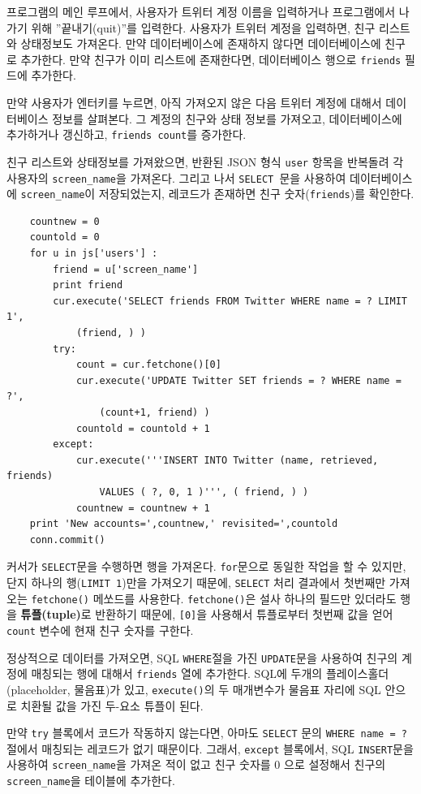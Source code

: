 프로그램의 메인 루프에서, 사용자가 트위터 계정 이름을 입력하거나 프로그램에서 나가기 위해 ''끝내기(quit)''를 입력한다.
사용자가 트위터 계정을 입력하면, 친구 리스트와 상태정보도 가져온다. 
만약 데이터베이스에 존재하지 않다면 데이터베이스에 친구로 추가한다.
만약 친구가 이미 리스트에 존재한다면, 데이터베이스 행으로 {\tt friends} 필드에 추가한다.

만약 사용자가 엔터키를 누르면, 아직 가져오지 않은 다음 트위터 계정에 대해서 데이터베이스 정보를 살펴본다.
그 계정의 친구와 상태 정보를 가져오고, 데이터베이스에 추가하거나 갱신하고, {\tt friends count}를 증가한다.

친구 리스트와 상태정보를 가져왔으면, 반환된 JSON 형식 {\tt user} 항목을 반복돌려 각 사용자의 \verb"screen_name"을 가져온다. 
그리고 나서 {\tt SELECT }문을 사용하여 데이터베이스에 \verb"screen_name"이 저장되었는지, 레코드가 존재하면 친구 숫자({\tt friends})를 확인한다.

\beforeverb
\begin{verbatim}
    countnew = 0
    countold = 0
    for u in js['users'] :
        friend = u['screen_name']
        print friend
        cur.execute('SELECT friends FROM Twitter WHERE name = ? LIMIT 1', 
            (friend, ) )
        try:
            count = cur.fetchone()[0]
            cur.execute('UPDATE Twitter SET friends = ? WHERE name = ?', 
                (count+1, friend) )
            countold = countold + 1
        except:
            cur.execute('''INSERT INTO Twitter (name, retrieved, friends) 
                VALUES ( ?, 0, 1 )''', ( friend, ) )
            countnew = countnew + 1
    print 'New accounts=',countnew,' revisited=',countold
    conn.commit()
\end{verbatim}
\afterverb
%

커서가 {\tt SELECT}문을 수행하면 행을 가져온다. 
{\tt for}문으로 동일한 작업을 할 수 있지만, 단지 하나의 행({\tt LIMIT 1})만을 가져오기 때문에,
{\tt SELECT} 처리 결과에서 첫번째만 가져오는 {\tt fetchone()} 메쏘드를 사용한다.
{\tt fetchone()}은 설사 하나의 필드만 있더라도 행을 {\bf 튜플(tuple)}로 반환하기 때문에,
{\tt [0]}을 사용해서 튜플로부터 첫번째 값을 얻어 {\tt count} 변수에 현재 친구 숫자를 구한다.

정상적으로 데이터를 가져오면, SQL {\tt WHERE}절을 가진 {\tt UPDATE}문을 사용하여
친구의 계정에 매칭되는 행에 대해서 {\tt friends} 열에 추가한다.
SQL에 두개의 플레이스홀더(placeholder, 물음표)가 있고, {\tt execute()}의 두 매개변수가 
물음표 자리에 SQL 안으로 치환될 값을 가진 두-요소 튜플이 된다.

만약 {\tt try} 블록에서 코드가 작동하지 않는다면, 아마도 {\tt SELECT} 문의 {\tt WHERE name = ?} 절에서 매칭되는 레코드가 없기 때문이다.
그래서, {\tt except} 블록에서, SQL {\tt INSERT}문을 사용하여 \verb"screen_name"을 가져온 적이 없고 친구 숫자를 0 으로 설정해서 
친구의 \verb"screen_name"을 테이블에 추가한다. 

